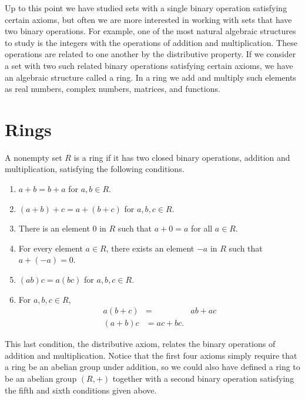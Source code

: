  
Up to this point we have studied sets with a single binary operation
satisfying certain axioms, but often we are more interested in working
with sets that have two binary operations.  For example, one of the
most natural algebraic structures to study is the integers 
with the operations of addition and multiplication. These operations
are related to one another by the distributive
property. If we consider a set with two such related binary operations
satisfying certain axioms, we have an algebraic structure called a
ring. In a ring we add and multiply such elements as real numbers,
complex numbers, matrices, and functions. 
 

\section{Rings}

A nonempty set $R$ is a {\bfi ring\/} if
it has two closed binary operations, addition and multiplication,
satisfying the following conditions.  
\begin{enumerate}
 
\item
$a + b = b + a$ for $a, b \in R$.
 
\item
$(a + b) + c = a + ( b + c)$ for $a, b, c  \in R$.
 
\item
There is an element $0$ in $R$ such that $a + 0 = a$ for all $a \in
R$. 
 
\item
For every element $a \in R$, there exists an element $-a$ in $R$ such
that $a + (-a) = 0$. 
 
\item
$(ab)  c = a  ( b  c)$ for $a, b, c  \in R$.
 
\item
For $a, b, c \in R$,
\begin{align*}
a( b + c)&  = & ab +ac \\
(a + b)c & = ac + bc.
\end{align*}
 
\end{enumerate}
This last condition, the distributive axiom, relates the binary
operations of addition and multiplication. Notice that the first four
axioms simply require that a ring be an abelian group under addition,
so we could also have defined a ring to be an abelian group
$(R, +)$ together with a second binary operation satisfying the fifth
and sixth conditions given above.  
 
